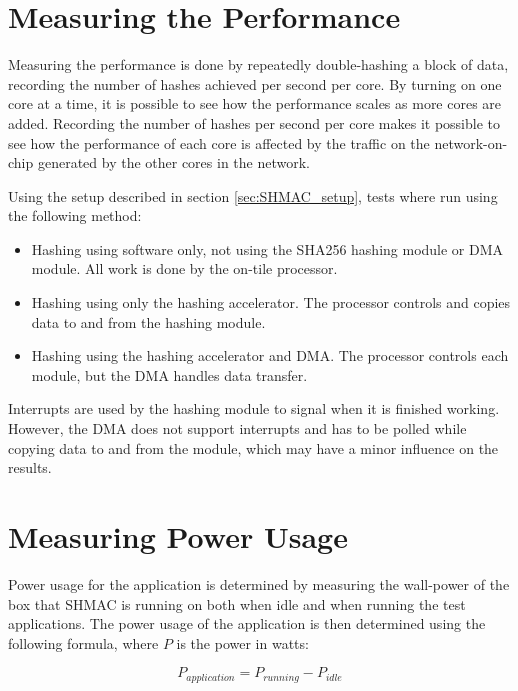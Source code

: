 \section{Measuring the Performance}

Measuring the performance is done by repeatedly double-hashing a block of data, recording the
number of hashes achieved per second per core. By turning on one core at a time, it
is possible to see how the performance scales as more cores are added. Recording
the number of hashes per second per core makes it possible to see how the performance
of each core is affected by the traffic on the network-on-chip generated by the other
cores in the network.

Using the setup described in section \ref{sec:SHMAC_setup}, tests where run using the
following method:

\begin{itemize}
    \item Hashing using software only, not using the SHA256 hashing module or DMA module.
    All work is done by the on-tile processor.
    \item Hashing using only the hashing accelerator.
    The processor controls and copies data to and from the hashing module.
    \item Hashing using the hashing accelerator and DMA.
    The processor controls each module, but the DMA handles data transfer.
\end{itemize}

Interrupts are used by the hashing module to signal when it is finished working. However,
the DMA does not support interrupts and has to be polled while copying data to and from
the module, which may have a minor influence on the results.

\section{Measuring Power Usage}

Power usage for the application is determined by measuring the wall-power of the box
that SHMAC is running on both when idle and when running the test applications. The
power usage of the application is then determined using the following formula, where
$P$ is the power in watts:

\[P_{application} = P_{running} - P_{idle}\]




%
%



